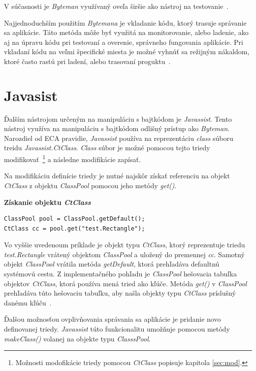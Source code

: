 \documentclass[11pt,final,oneside]{fithesis}
\newenvironment{example}[1]
{
\vspace{3mm}
\noindent\textbf{#1}
\vspace{2mm}
}
{
\vspace{3mm}
}
\begin{document}
V súčasnosti je \textit{Byteman} využívaný oveľa širšie ako nástroj na
testovanie~\cite{RedHat:Byteman}. 

Najjednoduchším použitím \textit{Bytemana} je vkladanie kódu, ktorý trasuje 
správanie sa aplikácie. Táto metóda môže byť využitá na monitorovanie,
alebo ladenie, ako aj na úpravu kódu pri testovaní a overenie, správneho 
fungovania aplikácie. Pri vkladaní kódu na veľmi špecifické miesta je možné
vyhnúť sa režijným nákaldom, ktoré často rastú pri ladení, alebo trasovaní 
proguktu~\cite{Byteman:Homepage}.

\chapter{Javasist}

Ďalším nástrojom určeným na manipuláciu s bajtkódom je \textit{Javassist}. Tento nástroj využíva na manipuláciu s bajtkódom odlišný prístup ako
\textit{Byteman}. Narozdiel od ECA pravidie, \textit{Javassist} používa na reprezentáciu \textit{class} súboru treidu \textit{Javassist.CtClass}.
\textit{Class} súbor je možné pomocou tejto triedy
modifikovať~\footnote{Možnosti modofikácie triedy pomocou \textit{CtClass} popisuje kapitola \ref{sec:mod}.} a následne modifikácie zapísať.

Na modifikáciu definície triedy je nutné najskôr získať referenciu na objekt
\textit{CtClass} z objektu \textit{ClassPool} pomocou jeho metódy
\textit{get()}.

\begin{example}{Získanie objektu \textit{CtClass}}
\begin{verbatim}
ClassPool pool = ClassPool.getDefault();
CtClass cc = pool.get("test.Rectangle");
\end{verbatim}
\end{example}

Vo vyššie uvedenoum príklade je objekt typu \textit{CtClass}, ktorý reprezentuje triedu \textit{test.Rectangle} vrátený objektom \textit{ClassPool} a uložený do premennej \textit{cc}. Samotný objekt \textit{ClassPool} vrátila metóda \textit{getDefault}, ktorá prehľadáva defaultnú systémovú cestu. Z implementačného pohľadu je \textit{ClassPool} hešovacia tabuľka objektov
\textit{CtClass}, ktorá používa mená tried ako kľúče. Metóda \textit{get()} v
\textit{ClassPool} prehľadáva túto hešovaciu tabuľku, aby našla objekty typu
\textit{CtClass} príslušný danému kľúču~\cite{Chiba:Javassist}.

Ďalšou možnosťou ovplivňovania správania sa aplikácie je pridanie novo definovanej triedy. \textit{Javassist} túto funkcionalitu umožňuje pomocou metódy \textit{makeClass()} volanej na objekte typu \textit{ClasssPool}.
\end{document}
